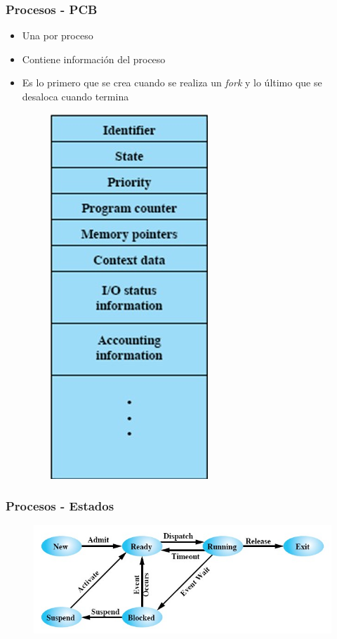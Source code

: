 \begin{frame}
  \frametitle{Procesos - PCB}
  \begin{itemize}
	  \item Una por proceso
	  \item Contiene información del proceso
	  \item Es lo primero que se crea cuando se realiza un \textit{fork} y lo último que se desaloca cuando termina
	  \begin{figure}
			\includegraphics[scale=0.2]{images/pcb.png}
	  \end{figure}	  
  \end{itemize}
\end{frame}

\begin{frame}
  \frametitle{Procesos - Estados}
  \begin{figure}
		\includegraphics[scale=0.5]{images/statesProcess.png}
  \end{figure}
\end{frame}

